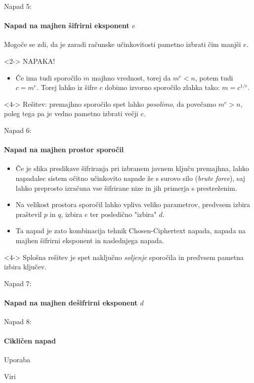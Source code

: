 \documentclass[a4paper, 12pt]{beamer} %
\begin{document}
\begin{frame}{Napad 5:}
 \framesubtitle{Napad na majhen šifrirni eksponent $e$}
Mogoče se zdi, da je zaradi računske učinkovitosti pametno izbrati čim manjši $e$.
\newline
\begin{block}<2->{}
\alert{NAPAKA!}
\end{block}
\begin{itemize}[label=]
\item<3-> Če ima tudi sporočilo $m$ majhno vrednost, torej da $m^e < n$, potem tudi $c = m^e$. Torej lahko iz šifre $c$ dobimo izvorno sporočilo zlahka tako: $m = c^{1/e}$.
\end{itemize}
\begin{block}<4->{}
Rešitev: premajhno sporočilo spet lahko \emph{posolimo}, da povečamo $m^e > n$, poleg tega pa je vedno pametno izbrati večji $e$.
\end{block}
\end{frame}

\begin{frame}{Napad 6:}
\framesubtitle{Napad na majhen prostor sporočil}
\begin{itemize}[label=]
\item<1-> Če je slika preslikave šifriranja pri izbranem javnem ključu premajhna, lahko napadalec sistem očitno učinkovito napade že s surovo silo (\emph{brute force}), saj lahko preprosto izračuna vse šifrirane nize in jih primerja s prestreženim.
\item<2-> Na velikost prostora sporočil lahko vpliva veliko parametrov, predvsem izbira praštevil $p$ in $q$, izbira $e$ ter posledično "izbira" $d$.
\item<3-> Ta napad je zato kombinacija tehnik Chosen-Ciphertext napada, napada na majhen šifrirni eksponent in naslednjega napada.
\end{itemize}
\begin{block}<4->{}
Splošna rešitev je spet naključno \emph{soljenje} sporočila in predvsem pametna izbira ključev.
\end{block}
\end{frame}

\begin{frame}{Napad 7:}
\framesubtitle{Napad na majhen dešifrirni eksponent $d$}
\end{frame}

\begin{frame}{Napad 8:}
\framesubtitle{Cikličen napad}
\end{frame}

\begin{frame}{Uporaba}
\end{frame}

\begin{frame}{Viri}
\end{frame}
\end{document}
